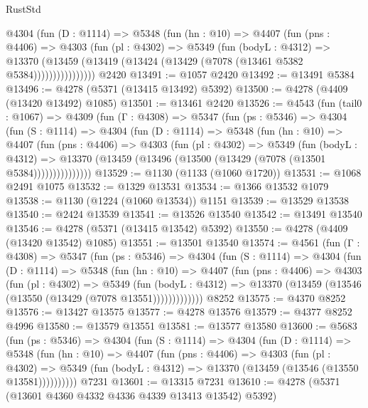 \begin{lexlean}{RustStd}
\begin{coremodule}
{\begin{coremodule}
{{{{{{{{{{{{{{{{{{{{{{{{{{{{{{{{{{{            @4304
              (fun (D : @1114) =>
              @5348
                (fun (hn : @10) =>
                @4407
                  (fun (pns : @4406) =>
                  @4303
                    (fun (pl : @4302) =>
                    @5349
                      (fun (bodyL : @4312) =>
                      @13370
                        (@13459 (@13419 (@13424 (@13429 (@7078 (@13461 @5382 @5384))))))))))))))))
    @2420
@13491 := @1057 @2420
@13492 := @13491 @5384
@13496 := @4278 (@5371 (@13415 @13492) @5392)
@13500 := @4278 (@4409 (@13420 @13492) @1085)
@13501 := @13461 @2420
@13526 := @4543
    (fun (tail0 : @1067) =>
    @4309
      (fun (Γ : @4308) =>
      @5347
        (fun (ps : @5346) =>
        @4304
          (fun (S : @1114) =>
          @4304
            (fun (D : @1114) =>
            @5348
              (fun (hn : @10) =>
              @4407
                (fun (pns : @4406) =>
                @4303
                  (fun (pl : @4302) =>
                  @5349
                    (fun (bodyL : @4312) =>
                    @13370 (@13459 (@13496 (@13500 (@13429 (@7078 (@13501 @5384)))))))))))))))
@13529 := @1130 (@1133 (@1060 @1720))
@13531 := @1068 @2491 @1075
@13532 := @1329 @13531
@13534 := @1366 @13532 @1079
@13538 := @1130 (@1224 (@1060 @13534)) @1151
@13539 := @13529 @13538
@13540 := @2424 @13539
@13541 := @13526 @13540
@13542 := @13491 @13540
@13546 := @4278 (@5371 (@13415 @13542) @5392)
@13550 := @4278 (@4409 (@13420 @13542) @1085)
@13551 := @13501 @13540
@13574 := @4561
    (fun (Γ : @4308) =>
    @5347
      (fun (ps : @5346) =>
      @4304
        (fun (S : @1114) =>
        @4304
          (fun (D : @1114) =>
          @5348
            (fun (hn : @10) =>
            @4407
              (fun (pns : @4406) =>
              @4303
                (fun (pl : @4302) =>
                @5349
                  (fun (bodyL : @4312) =>
                  @13370 (@13459 (@13546 (@13550 (@13429 (@7078 @13551)))))))))))))
    @8252
@13575 := @4370 @8252
@13576 := @13427 @13575
@13577 := @4278 @13576
@13579 := @4377 @8252 @4996
@13580 := @13579 @13551
@13581 := @13577 @13580
@13600 := @5683
    (fun (ps : @5346) =>
    @4304
      (fun (S : @1114) =>
      @4304
        (fun (D : @1114) =>
        @5348
          (fun (hn : @10) =>
          @4407
            (fun (pns : @4406) =>
            @4303
              (fun (pl : @4302) =>
              @5349 (fun (bodyL : @4312) => @13370 (@13459 (@13546 (@13550 @13581))))))))))
    @7231
@13601 := @13315 @7231
@13610 := @4278 (@5371 (@13601 @4360 @4332 @4336 @4339 @13413 @13542) @5392)
}}}}}}}}}}}}}}}}}}}}}}}}}}}}}}}}}}}
\end{coremodule}}
\end{coremodule}
\end{lexlean}
